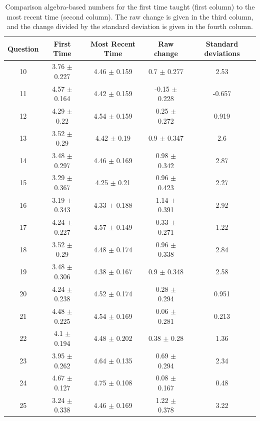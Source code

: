 \documentclass[../../main.tex]{subfiles}
\begin{document}
\begin{table}
\small
\centering
\begin{tabular}{| c | c | c | c | c |}
\hline
\hline
Question & First Time & Most Recent Time & Raw change & Standard deviations \\
\hline
10 & 3.76 $\pm$ 0.227 & 4.46 $\pm$ 0.159 & 0.7 $\pm$ 0.277 & 2.53 \\ \hline
11 & 4.57 $\pm$ 0.164 & 4.42 $\pm$ 0.159 & -0.15 $\pm$ 0.228 & -0.657 \\ \hline
12 & 4.29 $\pm$ 0.22 & 4.54 $\pm$ 0.159 & 0.25 $\pm$ 0.272 & 0.919 \\ \hline
13 & 3.52 $\pm$ 0.29 & 4.42 $\pm$ 0.19 & 0.9 $\pm$ 0.347 & 2.6 \\ \hline
14 & 3.48 $\pm$ 0.297 & 4.46 $\pm$ 0.169 & 0.98 $\pm$ 0.342 & 2.87 \\ \hline
15 & 3.29 $\pm$ 0.367 & 4.25 $\pm$ 0.21 & 0.96 $\pm$ 0.423 & 2.27 \\ \hline
16 & 3.19 $\pm$ 0.343 & 4.33 $\pm$ 0.188 & 1.14 $\pm$ 0.391 & 2.92 \\ \hline
17 & 4.24 $\pm$ 0.227 & 4.57 $\pm$ 0.149 & 0.33 $\pm$ 0.271 & 1.22 \\ \hline
18 & 3.52 $\pm$ 0.29 & 4.48 $\pm$ 0.174 & 0.96 $\pm$ 0.338 & 2.84 \\ \hline
19 & 3.48 $\pm$ 0.306 & 4.38 $\pm$ 0.167 & 0.9 $\pm$ 0.348 & 2.58 \\ \hline
20 & 4.24 $\pm$ 0.238 & 4.52 $\pm$ 0.174 & 0.28 $\pm$ 0.294 & 0.951 \\ \hline
21 & 4.48 $\pm$ 0.225 & 4.54 $\pm$ 0.169 & 0.06 $\pm$ 0.281 & 0.213 \\ \hline
22 & 4.1 $\pm$ 0.194 & 4.48 $\pm$ 0.202 & 0.38 $\pm$ 0.28 & 1.36 \\ \hline
23 & 3.95 $\pm$ 0.262 & 4.64 $\pm$ 0.135 & 0.69 $\pm$ 0.294 & 2.34 \\ \hline
24 & 4.67 $\pm$ 0.127 & 4.75 $\pm$ 0.108 & 0.08 $\pm$ 0.167 & 0.48 \\ \hline
25 & 3.24 $\pm$ 0.338 & 4.46 $\pm$ 0.169 & 1.22 $\pm$ 0.378 & 3.22 \\ \hline
\hline
\end{tabular}
\caption{\label{tab:courses:intro_shifts_1} Comparison algebra-based numbers for the first time taught (first column) to the most recent time (second column). The raw change is given in the third column, and the change divided by the standard deviation is given in the fourth column.}
\end{table}
\end{document}
